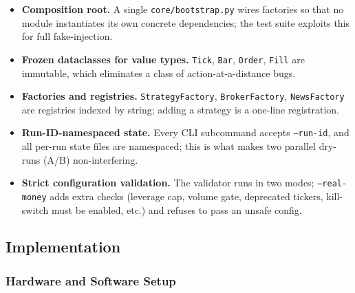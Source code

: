 \documentclass[a4paper, 12pt, titlepage]{article}
\begin{document}
\begin{itemize}[noitemsep]
    \item \textbf{Composition root.} A single \texttt{core/bootstrap.py}
    wires factories so that no module instantiates its own concrete
    dependencies; the test suite exploits this for full
    fake-injection.
    \item \textbf{Frozen dataclasses for value types.} \texttt{Tick},
    \texttt{Bar}, \texttt{Order}, \texttt{Fill} are immutable, which
    eliminates a class of action-at-a-distance bugs.
    \item \textbf{Factories and registries.}
    \texttt{StrategyFactory}, \texttt{BrokerFactory},
    \texttt{NewsFactory} are registries indexed by string; adding a
    strategy is a one-line registration.
    \item \textbf{Run-ID-namespaced state.} Every CLI subcommand
    accepts \texttt{--run-id}, and all per-run state files are
    namespaced; this is what makes two parallel dry-runs (A/B)
    non-interfering.
    \item \textbf{Strict configuration validation.} The validator
    runs in two modes; \texttt{--real-money} adds extra checks
    (leverage cap, volume gate, deprecated tickers, kill-switch must
    be enabled, etc.) and refuses to pass an unsafe config.
\end{itemize}

\subsection{Implementation}

\subsubsection{Hardware and Software Setup}
\end{document}
